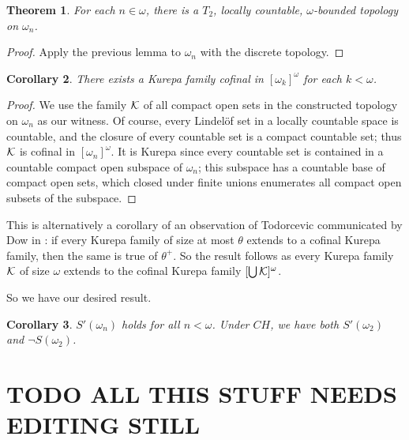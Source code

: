 \documentclass{amsart}
\theoremstyle{plain}
\newtheorem{theorem}{Theorem}
\newtheorem{corollary}[theorem]{Corollary}
\theoremstyle{definition}
\theoremstyle{remark}
\theoremstyle{plain}
\theoremstyle{definition}
\theoremstyle{remark}
\begin{document}
  \begin{theorem}
    For each $n\in \omega$, there is a \(T_2\), locally countable,
    $\omega$-bounded topology on $\omega_n$.
  \end{theorem}

  \begin{proof}
    Apply the previous lemma to \(\omega_n\) with the discrete topology.
  \end{proof}

  \begin{corollary}
    There exists a Kurepa family cofinal in \([\omega_k]^\omega\)
    for each \(k<\omega\).
  \end{corollary}

  \begin{proof}
    We use the family \(\mathcal{K}\) of all compact
    open sets in the constructed topology on
    \(\omega_n\) as our witness. Of course, every Lindel\"of set in
    a locally countable space is countable, and the closure of every
    countable set is a compact countable set; thus \(\mathcal{K}\)
    is cofinal in \([\omega_n]^\omega\).
    It is Kurepa since every countable set is contained in a countable
    compact open subspace of \(\omega_n\); this subspace has a countable
    base of compact open sets, which closed under finite unions enumerates
    all compact open subsets of the subspace.
  \end{proof}

  This is alternatively a corollary of an observation of Todorcevic
  communicated by Dow in \cite{MR1229125}:
  if every Kurepa family of size at most \(\theta\)
  extends to a cofinal Kurepa family, then the same is true of \(\theta^+\).
  So the result follows as
  every Kurepa family \(\mathcal{K}\) of size \(\omega\) extends to
  the cofinal Kurepa family \([\bigcup\mathcal{K}]^\omega\).

  So we have our desired result.

  \begin{corollary}
    \(S'(\omega_n)\) holds for all \(n<\omega\). Under \(CH\), we have
    both \(S'(\omega_2)\) and \(\neg S(\omega_2)\).
  \end{corollary}









  \newpage

  \section{TODO ALL THIS STUFF NEEDS EDITING STILL}
\end{document}
